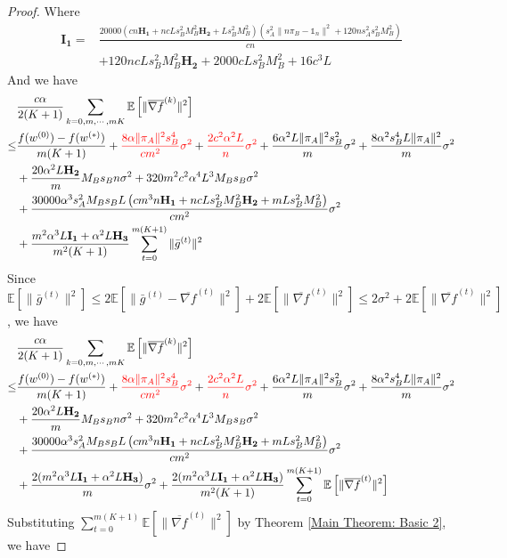 \documentclass{article}
\newcommand{\EE}[1]{\mathbb{E}\left[#1\right]}
\newcommand{\norm}[1]{\| #1 \|}
\newcommand{\one}{\mathds{1}_n}
\begin{document}
\begin{proof}
  Where
  \begin{align*}
    \mathbf{I_1}=&  \frac{20000  \left(cn\mathbf{H_1}+nc Ls_B^2M_B^2\mathbf{H_2} +Ls_B^2M_B^2\right)\left(s_A^2\norm{n\pi_B-\one}^2+120ns_A^2s_B^2M_B^2\right)}{cn}\\&+120ncLs_B^2M_B^2 \mathbf{H_2}+2000cLs_B^2M_B^2+16c^3 L
  \end{align*}
  And we have 
  \begin{align*}
    &\frac{c\alpha }{2(K+1)}\sum_{k=0,m,\cdots,mK}\EE{\norm{\overline{\nabla f}^{(k)}}^2}
  \\\leq& \frac{f(w^{(0)})-f(w^{(*)})}{m(K+1)}+\textcolor{red}{\frac{8\alpha \norm{\pi_A}^2s_B^4}{cm^2}\sigma^2}+\textcolor{red}{ \frac{2c^2\alpha^2L}{n}\sigma^2}+\frac{6\alpha^2L\norm{\pi_A}^2s_B^2}{m}\sigma^2+\frac{8\alpha^2s_B^4L\norm{\pi_A}^2}{m}\sigma^2\\&+\frac{20\alpha^2 L \mathbf{H_2}}{m}M_Bs_Bn \sigma^2+320m^2c^2\alpha^4L^3M_Bs_B\sigma^2\\&+\frac{30000\alpha^3 s_A^2M_Bs_BL \left(cm^3n\mathbf{H_1}+nc Ls_B^2M_B^2\mathbf{H_2} +mLs_B^2M_B^2\right)}{cm^2}\sigma^2\\&+\frac{m^2\alpha^3L\mathbf{I_1}+\alpha^2 L \mathbf{H_3}}{m^2(K+1)}\sum_{t=0}^{m(K+1)}\norm{\bar{g}^{(t)}}^2
  \end{align*}
  Since $\EE{\norm{\bar{g}^{(t)}}^2}\leq 2\EE{\norm{\bar{g}^{(t)}-\overline{\nabla f}^{(t)}}^2}+2\EE{\norm{\overline{\nabla f}^{(t)}}^2}\leq 2\sigma^2+2\EE{\norm{\overline{\nabla f}^{(t)}}^2}$, we have
  \begin{align*}
    &\frac{c\alpha }{2(K+1)}\sum_{k=0,m,\cdots,mK}\EE{\norm{\overline{\nabla f}^{(k)}}^2}
  \\\leq& \frac{f(w^{(0)})-f(w^{(*)})}{m(K+1)}+\textcolor{red}{\frac{8\alpha \norm{\pi_A}^2s_B^4}{cm^2}\sigma^2}+\textcolor{red}{ \frac{2c^2\alpha^2L}{n}\sigma^2}+\frac{6\alpha^2L\norm{\pi_A}^2s_B^2}{m}\sigma^2+\frac{8\alpha^2s_B^4L\norm{\pi_A}^2}{m}\sigma^2\\&+\frac{20\alpha^2 L \mathbf{H_2}}{m}M_Bs_Bn \sigma^2+320m^2c^2\alpha^4L^3M_Bs_B\sigma^2\\&+\frac{30000\alpha^3 s_A^2M_Bs_BL \left(cm^3n\mathbf{H_1}+nc Ls_B^2M_B^2\mathbf{H_2} +mLs_B^2M_B^2\right)}{cm^2}\sigma^2\\&+\frac{2(m^2\alpha^3L\mathbf{I_1}+\alpha^2 L \mathbf{H_3})}{m}\sigma^2+\frac{2(m^2\alpha^3L\mathbf{I_1}+\alpha^2 L \mathbf{H_3})}{m^2(K+1)}\sum_{t=0}^{m(K+1)}\EE{\norm{\overline{\nabla f}^{(t)}}^2}
  \end{align*}
  Substituting $\sum_{t=0}^{m(K+1)}\EE{\norm{\overline{\nabla f}^{(t)}}^2}$ by Theorem \ref{Main Theorem: Basic 2}, we have

\end{proof}
\end{document}
